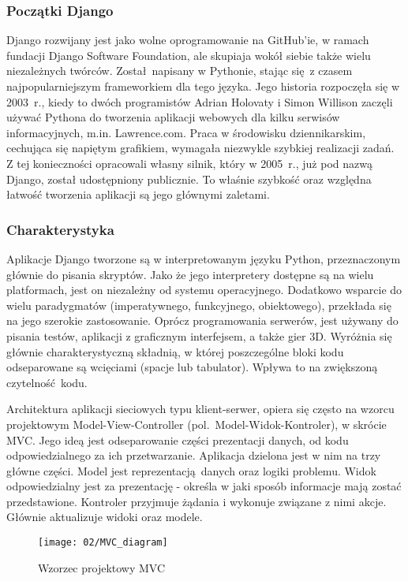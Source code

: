 \subsubsection*{Początki Django}
Django rozwijany jest jako wolne oprogramowanie na GitHub'ie, w ramach fundacji Django Software Foundation, ale skupiaja wokół siebie także wielu niezależnych twórców. Został napisany w Pythonie, stając się z czasem najpopularniejszym frameworkiem dla tego języka. Jego historia rozpoczęła się w 2003~r., kiedy to dwóch programistów Adrian Holovaty i Simon Willison zaczęli używać Pythona do tworzenia aplikacji webowych dla kilku serwisów informacyjnych, m.in. Lawrence.com. Praca w środowisku dziennikarskim, cechująca się napiętym grafikiem, wymagała niezwykle szybkiej realizacji zadań. Z tej konieczności opracowali własny silnik, który w 2005~r., już pod nazwą Django, został udostępniony publicznie. To właśnie szybkość oraz względna łatwość tworzenia aplikacji są jego głównymi zaletami.

\subsubsection*{Charakterystyka}

Aplikacje Django tworzone są w interpretowanym języku Python, przeznaczonym głównie do pisania skryptów. Jako że jego interpretery dostępne są na wielu platformach, jest on niezależny od systemu operacyjnego. Dodatkowo wsparcie do wielu paradygmatów (imperatywnego, funkcyjnego, obiektowego), przekłada się na jego szerokie zastosowanie. Oprócz programowania serwerów, jest używany do pisania testów, aplikacji z graficznym interfejsem, a także gier 3D. Wyróżnia się głównie charakterystyczną składnią, w której poszczególne bloki kodu odseparowane są wcięciami (spacje lub tabulator). Wpływa to na zwiększoną czytelność kodu.

Architektura aplikacji sieciowych typu klient-serwer, opiera się często na wzorcu projektowym Model-View-Controller (pol.~Model-Widok-Kontroler), w skrócie MVC. Jego ideą jest odseparowanie części prezentacji danych, od kodu odpowiedzialnego za ich przetwarzanie. Aplikacja dzielona jest w nim na trzy główne części. Model jest reprezentacją danych oraz logiki problemu. Widok odpowiedzialny jest za prezentację - określa w jaki sposób informacje mają zostać przedstawione. Kontroler przyjmuje żądania i wykonuje związane z nimi akcje. Głównie aktualizuje widoki oraz modele.

\begin{figure}[h]
	\begin{center}
		\texttt{[image: 02/MVC\_diagram]}
	\end{center}
	\caption{Wzorzec projektowy MVC}
	\vspace{-0.3cm}
\end{figure}

